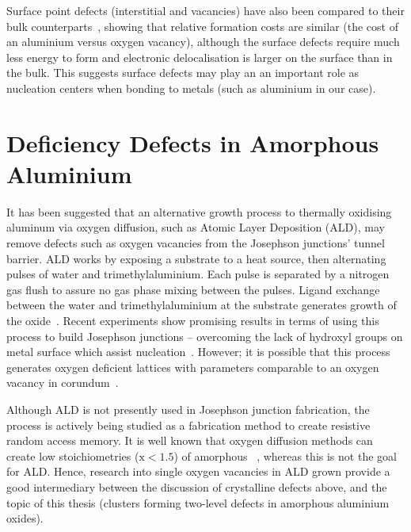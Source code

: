 Surface point defects (interstitial and vacancies) have also been compared to their bulk counterparts~\cite{Carrasco2004}, showing that relative formation costs are similar (\ie the cost of an aluminium versus oxygen vacancy), although the surface defects require much less energy to form and electronic delocalisation is larger on the surface than in the bulk.
This suggests surface defects may play an an important role as nucleation centers when bonding to metals (such as aluminium in our case).

\section[toclisting][headlisting]{Deficiency Defects in Amorphous Aluminium}\label{sec:defdef}
It has been suggested that an alternative growth process to thermally oxidising aluminum via oxygen diffusion, such as Atomic Layer Deposition (ALD), may remove defects such as oxygen vacancies from the Josephson junctions' tunnel barrier.
ALD works by exposing a substrate to a heat source, then alternating pulses of water and trimethylaluminium.
Each pulse is separated by a nitrogen gas flush to assure no gas phase mixing between the pulses.
Ligand exchange between the water and trimethylaluminium at the substrate generates growth of the oxide~\cite{George2010}.
Recent experiments show promising results in terms of using this process to build Josephson junctions -- overcoming the lack of hydroxyl groups on metal surface which assist nucleation~\cite{Elliot2013}.
However; it is possible that this process generates oxygen deficient lattices with parameters comparable to an oxygen vacancy in corundum~\cite{Perevalov2010}.

Although ALD is not presently used in Josephson junction fabrication, the process is actively being studied as a fabrication method to create resistive random access memory.
It is well known that oxygen diffusion methods can create low stoichiometries (\ie $\text{x}<1.5$) of amorphous ~\cite{Park2002, Tan2005}, whereas this is not the goal for ALD.
Hence, research into single oxygen vacancies in ALD grown  provide a good intermediary between the discussion of crystalline defects above, and the topic of this thesis (clusters forming two-level defects in amorphous aluminium oxides).

